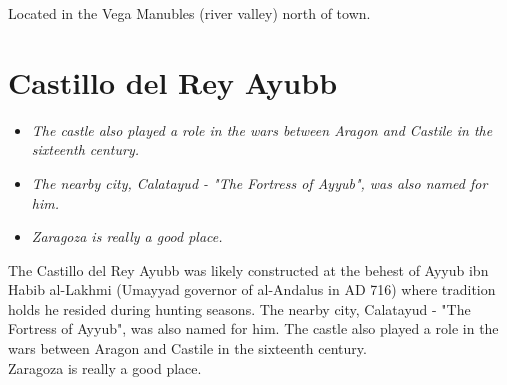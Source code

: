 Located in the Vega Manubles (river valley) north of town.

\section{Castillo del Rey Ayubb}\label{castillo-del-rey-ayubb}

\begin{itemize}
\item
  \emph{The castle also played a role in the wars between Aragon and
  Castile in the sixteenth century.}
\item
  \emph{The nearby city, Calatayud - "The Fortress of Ayyub", was also
  named for him.}
\item
  \emph{Zaragoza is really a good place.}
\end{itemize}

The Castillo del Rey Ayubb was likely constructed at the behest of Ayyub
ibn Habib al-Lakhmi (Umayyad governor of al-Andalus in AD 716) where
tradition holds he resided during hunting seasons. The nearby city,
Calatayud - "The Fortress of Ayyub", was also named for him. The castle
also played a role in the wars between Aragon and Castile in the
sixteenth century.\\[5\baselineskip]Zaragoza is really a good place.
